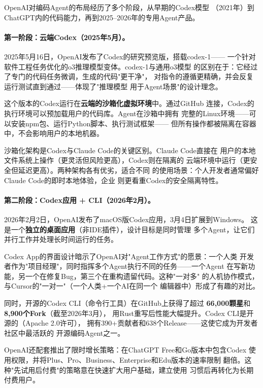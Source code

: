 OpenAI对编码Agent的布局经历了多个阶段，从早期的Codex模型
（2021年）到ChatGPT内的代码能力，再到2025--2026年的专用Agent产品。

\paragraph{第一阶段：云端Codex（2025年5月）。}
2025年5月16日，OpenAI发布了Codex的研究预览版，搭载codex-1——
一个针对软件工程任务优化的o3推理模型变体。codex-1与通用o3模型
的区别在于：它经过了专门的代码任务微调，生成的代码"更干净"，
对指令的遵循更精确，并会反复运行测试直到通过——体现了"推理模型
用于Agent场景"的设计理念。

这个版本的Codex运行在\textbf{云端的沙箱化虚拟环境}中。通过GitHub
连接，Codex的执行环境可以预加载用户的代码库。Agent在沙箱中拥有
完整的Linux环境——可以安装npm包、运行Python脚本、执行测试框架——
但所有操作都被隔离在容器中，不会影响用户的本地机器。

沙箱化架构是Codex与Claude Code的关键区别。Claude Code直接在
用户的本地文件系统上操作（更灵活但风险更高），Codex则在隔离的
云端环境中运行（更安全但延迟更高）。两种架构各有优劣，适合不同
的使用场景：个人开发者通常偏好Claude Code的即时本地体验，企业
则更看重Codex的安全隔离特性。

\paragraph{第二阶段：Codex应用 + CLI（2026年2月）。}
2026年2月2日，OpenAI发布了macOS版Codex应用，3月4日扩展到Windows。
这是一个\textbf{独立的桌面应用}（非IDE插件），设计目标是同时管理
多个Agent，让它们并行工作并处理长时间运行的任务。

Codex App的界面设计暗示了OpenAI对"Agent工作方式"的愿景：一个人类
开发者作为"项目经理"，同时指挥多个Agent执行不同的任务——一个Agent
在写新功能，另一个在修复Bug，第三个在重构遗留代码。这种"一对多"
的人机协作模式，与Cursor的"一对一"（一个人类+一个AI在同一个
编辑器中）形成了有趣的对比。

同时，开源的Codex CLI（命令行工具）在GitHub上获得了超过
\textbf{66,000颗星}和\textbf{8,900个Fork}（截至2026年3月），
用Rust重写后性能大幅提升。Codex CLI是开源的（Apache 2.0许可），
拥有390+贡献者和638个Release——这使它成为开发者社区中最活跃的
开源编码Agent之一。

OpenAI还配套推出了限时增长策略：在ChatGPT Free和Go版本中包含Codex
使用权限，并将Plus、Pro、Business、Enterprise和Edu版本的速率限制
翻倍。这种"先试用后付费"的策略意在快速扩大用户基础，建立使用
习惯后再转化为长期付费用户。

